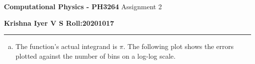 \documentclass[12 pt]{article}
\begin{document}
\begin{center}
       \large{
       \textbf{Computational Physics - PH3264} \break
	Assignment 2
}
\end{center}

\textbf{Krishna Iyer V S \hfill Roll:20201017}
\hrule 
\vspace{0.1cm}

\begin{enumerate}[a.]

\item The function's actual integrand is $\pi$. The following plot shows the errors plotted against the number of bins on a log-log scale.

\end{enumerate}
\end{document}

